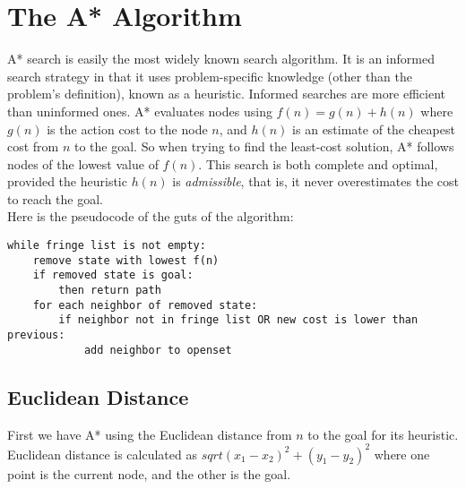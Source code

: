 \documentclass[12pt, article]{scrartcl}
\begin{document}
\section{The A* Algorithm}
A* search is easily the most widely known search algorithm. It is an informed search strategy in that it uses problem-specific knowledge (other than the problem's definition), known as a heuristic. Informed searches are more efficient than uninformed ones. A* evaluates nodes using $f(n) = g(n) + h(n)$ where $g(n)$ is the action cost to the node $n$, and $h(n)$ is an estimate of the cheapest cost from $n$ to the goal. So when trying to find the least-cost solution, A* follows nodes of the lowest value of $f(n)$. This search is both complete and optimal, provided the heuristic $h(n)$ is \emph{admissible}, that is, it never overestimates the cost to reach the goal. \\

Here is the pseudocode of the guts of the algorithm:
\begin{verbatim}
while fringe list is not empty:
    remove state with lowest f(n)
    if removed state is goal:
        then return path
    for each neighbor of removed state:
        if neighbor not in fringe list OR new cost is lower than previous:
            add neighbor to openset
\end{verbatim}

\subsection{Euclidean Distance}
First we have A* using the Euclidean distance from $n$ to the goal for its heuristic. Euclidean distance is calculated as $sqrt{(x_1-x_2)^2 + (y_1-y_2)^2}$ where one point is the current node, and the other is the goal.\\
\end{document}
